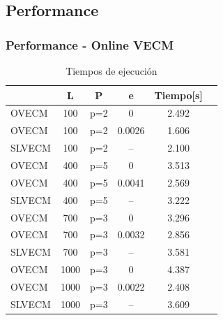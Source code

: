 \documentclass{beamer}
\begin{document}
        \subsection{Performance}
            \begin{frame}
            \frametitle{Performance - Online VECM}
            \begin{table}[h!]
            \caption{Tiempos de ejecución}
            \label{tab:extimes}
            \begin{center}
            \begin{tabular}{|l|c|c|c|c|c|}
            \hline
            & L & P & e  & Tiempo[s] \\
            \hline
            OVECM & 100 &p=2  & 0      & 2.492\\
            OVECM & 100 &p=2  & 0.0026  & 1.606\\
            SLVECM & 100 &p=2& -- & 2.100\\
            \hline
            OVECM & 400 & p=5  & 0      & 3.513\\
            OVECM & 400 &p=5  & 0.0041  & 2.569\\
            SLVECM & 400 & p=5 & -- & 3.222\\
            \hline
            OVECM & 700 &p=3  & 0      & 3.296\\
            OVECM & 700 &p=3  & 0.0032  & 2.856\\
            SLVECM & 700 &p=3 & -- & 3.581\\
            \hline
            OVECM & 1000 & p=3 & 0      & 4.387\\
            OVECM & 1000 & p=3  & 0.0022  & 2.408\\
            SLVECM & 1000 & p=3  & -- & 3.609\\
            \hline
            \end{tabular}
            \end{center}
            \end{table}
            \end{frame}
\end{document}
